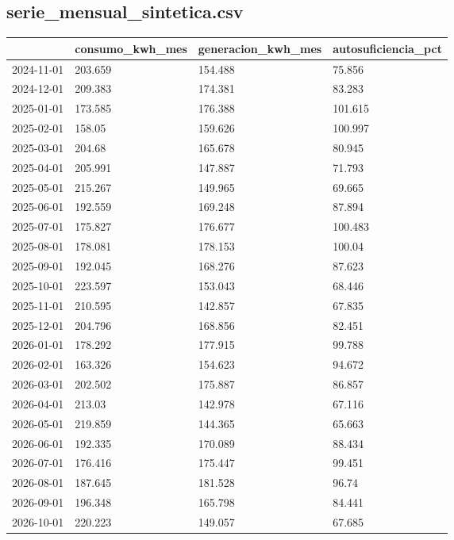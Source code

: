 \subsection*{serie\_mensual\_sintetica.csv}
{\footnotesize\begin{longtable}{@{}llll@{}}
\toprule
 & consumo\_kwh\_mes & generacion\_kwh\_mes & autosuficiencia\_pct \\
\midrule\endhead
2024-11-01 & 203.659 & 154.488 & 75.856 \\
2024-12-01 & 209.383 & 174.381 & 83.283 \\
2025-01-01 & 173.585 & 176.388 & 101.615 \\
2025-02-01 & 158.05 & 159.626 & 100.997 \\
2025-03-01 & 204.68 & 165.678 & 80.945 \\
2025-04-01 & 205.991 & 147.887 & 71.793 \\
2025-05-01 & 215.267 & 149.965 & 69.665 \\
2025-06-01 & 192.559 & 169.248 & 87.894 \\
2025-07-01 & 175.827 & 176.677 & 100.483 \\
2025-08-01 & 178.081 & 178.153 & 100.04 \\
2025-09-01 & 192.045 & 168.276 & 87.623 \\
2025-10-01 & 223.597 & 153.043 & 68.446 \\
2025-11-01 & 210.595 & 142.857 & 67.835 \\
2025-12-01 & 204.796 & 168.856 & 82.451 \\
2026-01-01 & 178.292 & 177.915 & 99.788 \\
2026-02-01 & 163.326 & 154.623 & 94.672 \\
2026-03-01 & 202.502 & 175.887 & 86.857 \\
2026-04-01 & 213.03 & 142.978 & 67.116 \\
2026-05-01 & 219.859 & 144.365 & 65.663 \\
2026-06-01 & 192.335 & 170.089 & 88.434 \\
2026-07-01 & 176.416 & 175.447 & 99.451 \\
2026-08-01 & 187.645 & 181.528 & 96.74 \\
2026-09-01 & 196.348 & 165.798 & 84.441 \\
2026-10-01 & 220.223 & 149.057 & 67.685 \\
\bottomrule
\end{longtable}}
